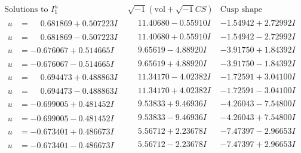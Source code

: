 \documentclass[1p]{elsarticle_modified}
\theoremstyle{definition}
\newcommand{\I}{\sqrt{-1}}
\begin{document}
$$\begin{array}{c|c|c}  
\text{Solutions to }I^u_{1}& \I (\text{vol} + \sqrt{-1}CS) & \text{Cusp shape}\\
 \hline 
\begin{aligned}
u &= \phantom{-}0.681869 + 0.507223 I\end{aligned}
 & \phantom{-}11.40680 - 0.55910 I & -1.54942 + 2.72992 I \\ \hline\begin{aligned}
u &= \phantom{-}0.681869 - 0.507223 I\end{aligned}
 & \phantom{-}11.40680 + 0.55910 I & -1.54942 - 2.72992 I \\ \hline\begin{aligned}
u &= -0.676067 + 0.514665 I\end{aligned}
 & \phantom{-}9.65619 - 4.88920 I & -3.91750 + 1.84392 I \\ \hline\begin{aligned}
u &= -0.676067 - 0.514665 I\end{aligned}
 & \phantom{-}9.65619 + 4.88920 I & -3.91750 - 1.84392 I \\ \hline\begin{aligned}
u &= \phantom{-}0.694473 + 0.488863 I\end{aligned}
 & \phantom{-}11.34170 - 4.02382 I & -1.72591 + 3.04100 I \\ \hline\begin{aligned}
u &= \phantom{-}0.694473 - 0.488863 I\end{aligned}
 & \phantom{-}11.34170 + 4.02382 I & -1.72591 - 3.04100 I \\ \hline\begin{aligned}
u &= -0.699005 + 0.481452 I\end{aligned}
 & \phantom{-}9.53833 + 9.46936 I & -4.26043 - 7.54800 I \\ \hline\begin{aligned}
u &= -0.699005 - 0.481452 I\end{aligned}
 & \phantom{-}9.53833 - 9.46936 I & -4.26043 + 7.54800 I \\ \hline\begin{aligned}
u &= -0.673401 + 0.486673 I\end{aligned}
 & \phantom{-}5.56712 + 2.23678 I & -7.47397 - 2.96653 I \\ \hline\begin{aligned}
u &= -0.673401 - 0.486673 I\end{aligned}
 & \phantom{-}5.56712 - 2.23678 I & -7.47397 + 2.96653 I \\ \hline\begin{aligned}

\end{aligned}
\end{array}$$
\end{document}
